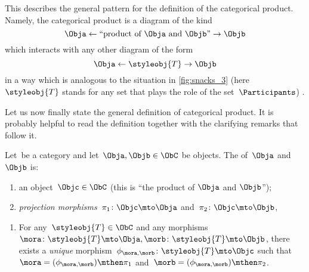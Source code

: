 This describes the general pattern for the definition of the categorical product.
Namely, the categorical product is a diagram of the kind
\begin{equation}
    \label{eq:prod-inline-generic-diagram}
    \Obja \leftarrow \text{``product of } \Obja \text{ and } \Objb \text{''}  \rightarrow \Objb
\end{equation}
which interacts with any other diagram of the form
\begin{equation}
    \label{eq:prod-inline-test-diagram}
    \Obja \leftarrow \styleobj{T} \rightarrow \Objb
\end{equation}
in a way which is analogous to the situation in \cref{fig:snacks_3} (here~$\styleobj{T}$ stands for any set that plays the role of the set~$\Participants$) .

Let us now finally state the general definition of categorical product.
It is probably helpful to read the definition together with the clarifying remarks that follow it.


\begin{ctdefinition}
    \label{def:categorical-product}
    Let~\CatC be a category and let~$\Obja, \Objb \in \ObC$ be objects.
    The \emph{} of~$\Obja$ and~$\Objb$ is: \\
    \constit
    \begin{enumerate}
        \item an object~$\Objc \in \ObC$ (this is ``the product of $\Obja$  and $\Objb$'');
        \item \emph{projection morphisms}~$\pi_1 \colon \Objc \mto \Obja$ and~$\pi_2 \colon \Objc \mto \Objb$,
    \end{enumerate}
    \condit
    \begin{enumerate}
        \item For any~$\styleobj{T} \in \ObC$ and any morphisms~$\mora \colon \styleobj{T} \mto \Obja, \morb \colon \styleobj{T} \mto \Objb$, there exists a \emph{unique} morphism~$\phi_{\mora,\morb} \colon \styleobj{T} \mto \Objc$ such that~$\mora = (\phi_{\mora,
                      \morb})\mthen \pi_1$ and~$\morb=(\phi_{\mora, \morb})\mthen \pi_2$.
    \end{enumerate}
\end{ctdefinition}

